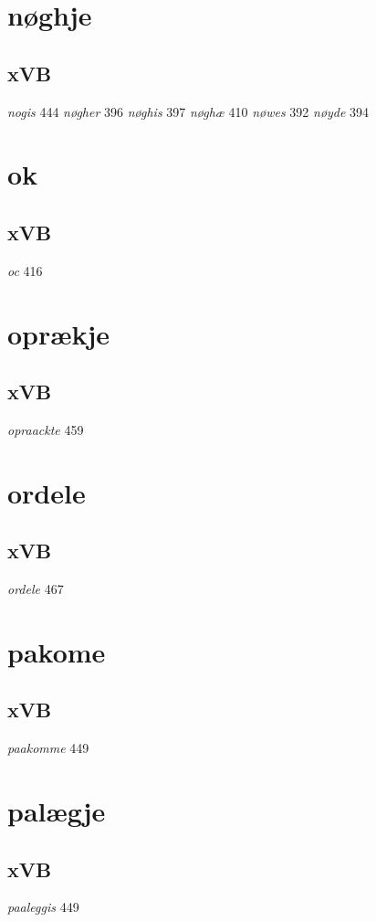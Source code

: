 \documentclass[a4paper,twocolumn]{article}
\begin{document}
\section{nøghje}
\label{sec:org48e2468}
\subsection{xVB}
\label{sec:orgb15b984}
\emph{nogis} 444 \emph{nøgher} 396 \emph{nøghis} 397 \emph{nøghæ} 410 \emph{nøwes} 392 \emph{nøyde} 394 
\section{ok}
\label{sec:orgdf216c6}
\subsection{xVB}
\label{sec:orgc0d4321}
\emph{oc} 416 
\section{oprækje}
\label{sec:org3a4fc05}
\subsection{xVB}
\label{sec:org9f7d73c}
\emph{opraackte} 459 
\section{ordele}
\label{sec:org36a6485}
\subsection{xVB}
\label{sec:orgc6cb7da}
\emph{ordele} 467 
\section{pakome}
\label{sec:orgc5939f9}
\subsection{xVB}
\label{sec:org6d3d8e2}
\emph{paakomme} 449 
\section{palægje}
\label{sec:orgc93e315}
\subsection{xVB}
\label{sec:orgd57f9a2}
\emph{paaleggis} 449 
\end{document}
